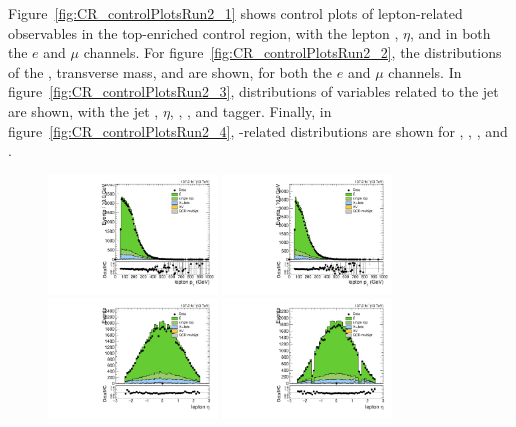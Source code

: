 Figure~\ref{fig:CR_controlPlotsRun2_1} shows control plots of lepton-related observables in the top-enriched control region, with the lepton \pt, $\eta$, and \Etmiss in both the $e$ and $\mu$ channels.
For figure~\ref{fig:CR_controlPlotsRun2_2}, the distributions of the \Wlep \pt, transverse mass, and \MVV are shown, for both the $e$ and $\mu$ channels.
In figure~\ref{fig:CR_controlPlotsRun2_3}, distributions of variables related to the \Vhad jet are shown, with the jet \pt, $\eta$, \MJ, \nsubjDDT, and \DoubleB tagger.
Finally, in figure~\ref{fig:CR_controlPlotsRun2_4}, \VBF-related distributions are shown for \DetaVBF, \mjjVBF, \nJets, and \Dy.

\begin{figure}[htbp]
  \centering
  \includegraphics[width=0.4\textwidth]{fig/analysis/CR_b1_mu_allP_allC_allE_Run2_lnujj_l1_l_pt.pdf}
  \includegraphics[width=0.4\textwidth]{fig/analysis/CR_b1_e_allP_allC_allE_Run2_lnujj_l1_l_pt.pdf}\\
  \includegraphics[width=0.4\textwidth]{fig/analysis/CR_b1_mu_allP_allC_allE_Run2_lnujj_l1_l_eta.pdf}
  \includegraphics[width=0.4\textwidth]{fig/analysis/CR_b1_e_allP_allC_allE_Run2_lnujj_l1_l_eta.pdf}\\

\end{figure}
